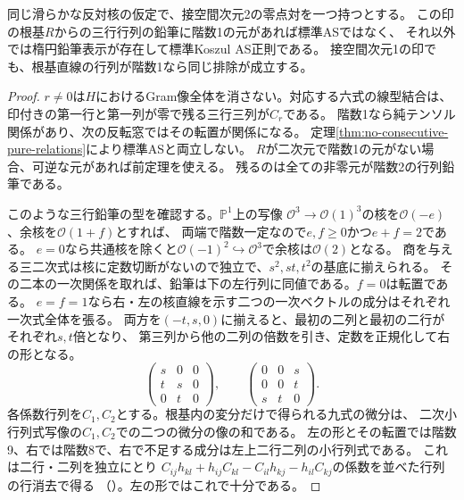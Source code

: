 \begin{corollary}[接空間二次元の印を持つ全候補]\label{cor:defect-two-decision}
同じ滑らかな反対核の仮定で、接空間次元2の零点対を一つ持つとする。
この印の根基$R$からの三行行列の鉛筆に階数1の元があれば標準ASではなく、
それ以外では楕円鉛筆表示が存在して標準Koszul AS正則である。
接空間次元1の印でも、根基直線の行列が階数1なら同じ排除が成立する。
\end{corollary}
\begin{proof}
$r\ne0$は$H$におけるGram像全体を消さない。対応する六式の線型結合は、
印付きの第一行と第一列が零で残る三行三列が$C_r$である。
階数1なら純テンソル関係があり、次の反転窓ではその転置が関係になる。
定理\ref{thm:no-consecutive-pure-relations}により標準ASと両立しない。
$R$が二次元で階数1の元がない場合、可逆な元があれば前定理を使える。
残るのは全ての非零元が階数2の行列鉛筆である。

このような三行鉛筆の型を確認する。$\mathbb P^1$上の写像
$\mathcal O^3\to\mathcal O(1)^3$の核を$\mathcal O(-e)$、余核を$\mathcal O(1+f)$とすれば、
両端で階数一定なので$e,f\ge0$かつ$e+f=2$である。
$e=0$なら共通核を除くと$\mathcal O(-1)^2\hookrightarrow\mathcal O^3$で余核は$\mathcal O(2)$となる。
商を与える三二次式は核に定数切断がないので独立で、$s^2,st,t^2$の基底に揃えられる。
その二本の一次関係を取れば、鉛筆は下の左行列に同値である。$f=0$は転置である。
$e=f=1$なら右・左の核直線を示す二つの一次ベクトルの成分はそれぞれ一次式全体を張る。
両方を$(-t,s,0)$に揃えると、最初の二列と最初の二行がそれぞれ$s,t$倍となり、
第三列から他の二列の倍数を引き、定数を正規化して右の形となる。
\[
 \begin{pmatrix}s&0&0\\t&s&0\\0&t&0\end{pmatrix},\qquad
 \begin{pmatrix}0&0&s\\0&0&t\\s&t&0\end{pmatrix}.
\]
各係数行列を$C_1,C_2$とする。根基内の変分だけで得られる九式の微分は、
二次小行列式写像の$C_1,C_2$での二つの微分の像の和である。
左の形とその転置では階数9、右では階数8で、右で不足する成分は左上二行二列の小行列式である。
これは二行・二列を独立にとり
$C_{ij}h_{kl}+h_{ij}C_{kl}-C_{il}h_{kj}-h_{il}C_{kj}$の係数を並べた行列の行消去で得る
（）。左の形ではこれで十分である。


\end{proof}
